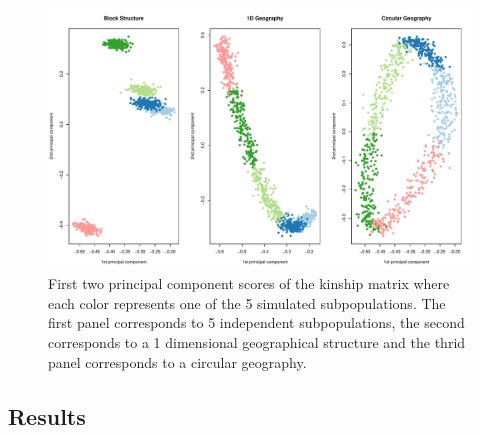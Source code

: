 \documentclass[12pt,letter]{article}\usepackage[]{graphicx}\usepackage[]{color}
\newenvironment{knitrout}{}{} %
\begin{document}
\begin{knitrout}\scriptsize
{}\color{fgcolor}\begin{figure}[H]

{\centering \includegraphics[width=1\linewidth]{figure/plot-pc-sim-1} 

}

\caption[First two principal component scores of the kinship matrix where each color represents one of the 5 simulated subpopulations]{First two principal component scores of the kinship matrix where each color represents one of the 5 simulated subpopulations. The first panel corresponds to 5 independent subpopulations, the second corresponds to a 1 dimensional geographical structure and the thrid panel corresponds to a circular geography.}\label{fig:plot-pc-sim}
\end{figure}


\end{knitrout}


\subsection{Results}
\end{document}
